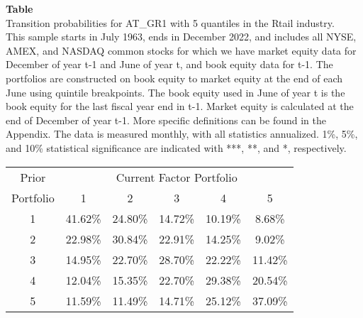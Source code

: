 \begin{table*}[ht!]
\raggedright
{}
\label{tab: transition_probs_AT_GR1_Rtail_with_5_quantiles}
\textbf{Table \thetable} \\
Transition probabilities for AT_GR1 with 5 quantiles in the Rtail industry. \\
\hspace*{1em}This sample starts in July 1963, ends in December 2022, and includes all NYSE, AMEX, and NASDAQ common stocks for which we have market equity data for December of year t-1 and June of year t, and book equity data for t-1. The portfolios are constructed on book equity to market equity at the end of each June using quintile breakpoints.  The book equity used in June of year t is the book equity for the last fiscal year end in t-1.  Market equity is calculated at the end of December of year t-1.  More specific definitions can be found in the Appendix.  The data is measured monthly, with all statistics annualized.  1\%, 5\%, and 10\% statistical significance are indicated with ***, **, and *, respectively. \\
\vspace{0.5em}
\centering
\begin{adjustbox}{max width=\textwidth}
\begin{tabular}{@{}cccccc@{}}
\toprule
Prior & \multicolumn{5}{c}{Current Factor Portfolio} \\
Portfolio & 1 & 2 & 3 & 4 & 5 \\
\midrule
1 & 41.62\% & 24.80\% & 14.72\% & 10.19\% & 8.68\% \\
2 & 22.98\% & 30.84\% & 22.91\% & 14.25\% & 9.02\% \\
3 & 14.95\% & 22.70\% & 28.70\% & 22.22\% & 11.42\% \\
4 & 12.04\% & 15.35\% & 22.70\% & 29.38\% & 20.54\% \\
5 & 11.59\% & 11.49\% & 14.71\% & 25.12\% & 37.09\% \\
\bottomrule
\end{tabular}
\end{adjustbox}
\end{table*}